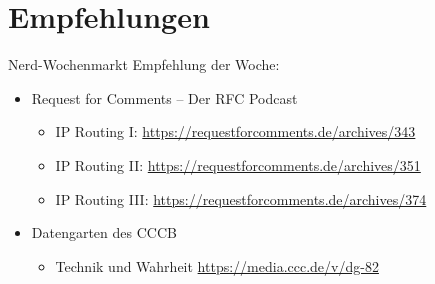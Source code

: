 \documentclass[xcolor=dvipsnames, aspectratio=169]{beamer}
\begin{document}
\section{Empfehlungen}
\begin{frame}{Nerd-Wochenmarkt}
Empfehlung der Woche:
\begin{itemize}
	\item Request for Comments -- Der RFC Podcast
	\begin{itemize}
		\item IP Routing I: \url{https://requestforcomments.de/archives/343}
		\item IP Routing II: \url{https://requestforcomments.de/archives/351}
		\item IP Routing III: \url{https://requestforcomments.de/archives/374}   
	\end{itemize}
	\item Datengarten des CCCB
	\begin{itemize}
		\item Technik und Wahrheit \url{https://media.ccc.de/v/dg-82}
	\end{itemize}
\end{itemize}
\end{frame}
\end{document}
